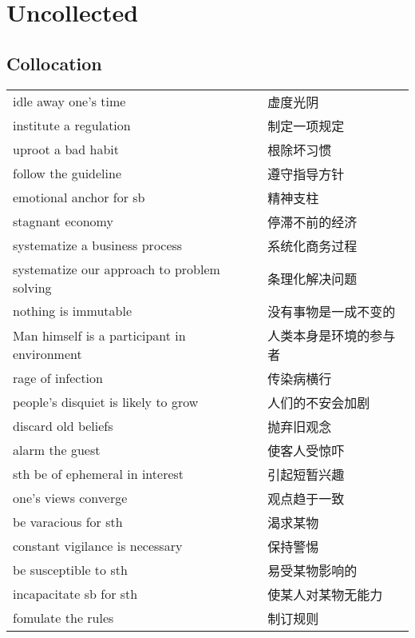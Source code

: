 \section{Uncollected}

\subsection{Collocation}

\begin{tabular}{ll}
    idle away one's time                        & 虚度光阴        \\
    institute a regulation                      & 制定一项规定      \\
    uproot a bad habit                          & 根除坏习惯       \\
    follow the guideline                        & 遵守指导方针      \\
    emotional anchor for sb                     & 精神支柱        \\
    stagnant economy                            & 停滞不前的经济     \\
    systematize a business process              & 系统化商务过程     \\
    systematize our approach to problem solving & 条理化解决问题     \\
    nothing is immutable                        & 没有事物是一成不变的  \\
    Man himself is a participant in environment & 人类本身是环境的参与者 \\
    rage of infection                           & 传染病横行       \\
    people's disquiet is likely to grow         & 人们的不安会加剧    \\
    discard old beliefs                         & 抛弃旧观念       \\
    alarm the guest                             & 使客人受惊吓      \\
    sth be of ephemeral in interest             & 引起短暂兴趣      \\
    one's views converge                        & 观点趋于一致      \\
    be varacious for sth                        & 渴求某物        \\
    constant vigilance is necessary             & 保持警惕        \\
    be susceptible to sth                       & 易受某物影响的     \\
    incapacitate sb for sth                     & 使某人对某物无能力   \\
    fomulate the rules                          & 制订规则        \\
\end{tabular}
